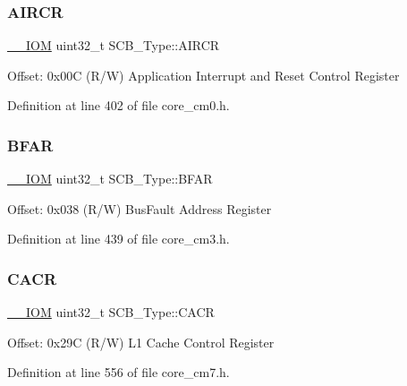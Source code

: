 \subsubsection{\texorpdfstring{A\+I\+R\+CR}{AIRCR}}
{\footnotesize\ttfamily \hyperlink{core__sc300_8h_ab6caba5853a60a17e8e04499b52bf691}{\+\_\+\+\_\+\+I\+OM} uint32\+\_\+t S\+C\+B\+\_\+\+Type\+::\+A\+I\+R\+CR}

Offset\+: 0x00C (R/W) Application Interrupt and Reset Control Register 

Definition at line 402 of file core\+\_\+cm0.\+h.

\mbox{\label{struct_s_c_b___type_a3f8e7e58be4e41c88dfa78f54589271c}} 
\subsubsection{\texorpdfstring{B\+F\+AR}{BFAR}}
{\footnotesize\ttfamily \hyperlink{core__sc300_8h_ab6caba5853a60a17e8e04499b52bf691}{\+\_\+\+\_\+\+I\+OM} uint32\+\_\+t S\+C\+B\+\_\+\+Type\+::\+B\+F\+AR}

Offset\+: 0x038 (R/W) Bus\+Fault Address Register 

Definition at line 439 of file core\+\_\+cm3.\+h.

\mbox{\label{struct_s_c_b___type_a51f9bd107a4e1d46ba647384e5c825b5}} 
\subsubsection{\texorpdfstring{C\+A\+CR}{CACR}}
{\footnotesize\ttfamily \hyperlink{core__sc300_8h_ab6caba5853a60a17e8e04499b52bf691}{\+\_\+\+\_\+\+I\+OM} uint32\+\_\+t S\+C\+B\+\_\+\+Type\+::\+C\+A\+CR}

Offset\+: 0x29C (R/W) L1 Cache Control Register 

Definition at line 556 of file core\+\_\+cm7.\+h.

\mbox{\label{struct_s_c_b___type_a2d6653b0b70faac936046a02809b577f}} 
